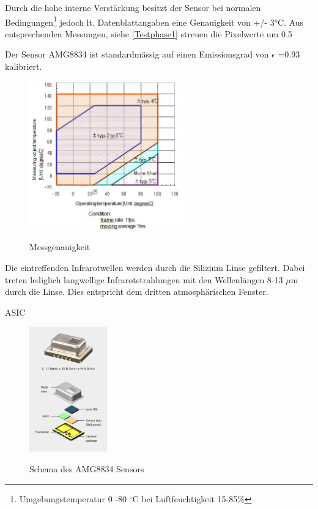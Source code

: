 Durch die hohe interne Verstärkung besitzt der Sensor bei normalen Bedingungen\footnote[2]{Umgebungstemperatur 0 -80 $^\circ$C bei Luftfeuchtigkeit 15-85\%} jedoch lt. Datenblattangaben eine Genauigkeit von +/- 3°C. Aus entsprechenden Messungen, siehe \ref{Testphase1} streuen die Pixelwerte um 0.5








Der Sensor AMG8834 ist standardmässig auf einen Emissionsgrad von $\epsilon$ =0.93 kalibriert.

\begin{figure}[H]
	\centering
	\includegraphics[width=0.6\textwidth]
	{fig/accuracy.PNG}
	\caption[Messgenauigkeit]{Messgenauigkeit} \protect\cite{AMG8834}
	\label{fig:Temperaturbereich}
\end{figure}


Die eintreffenden Infrarotwellen werden durch die Silizium Linse gefiltert. Dabei treten lediglich langwellige  Infrarotstrahlungen mit den Wellenlängen 8-13 $\mu$m durch die Linse. Dies entspricht dem dritten atmosphärischen Fenster.


\ac{ASIC}

\begin{figure}[H]
	\centering
	\includegraphics[width=0.3\textwidth]
	{fig/grid_eye_aufbau.PNG}
	\caption[Schema des AMG8834 Sensors]{Schema des AMG8834 Sensors} \protect\cite{AMG8834}
	\label{fig:Explosionsdarstellung}
\end{figure}







